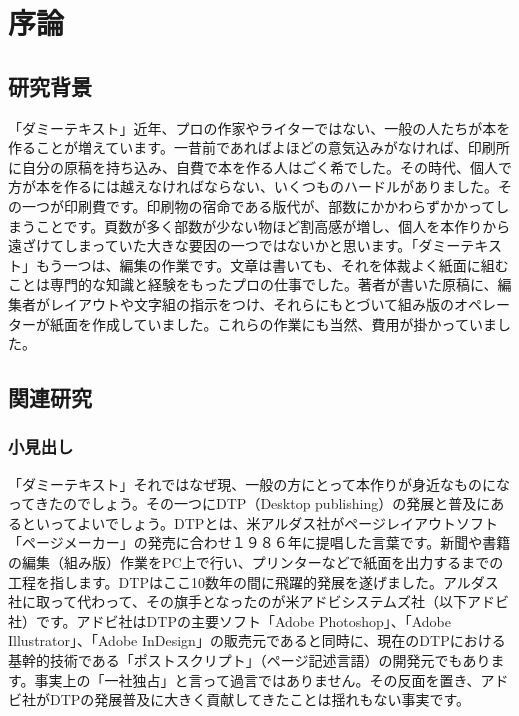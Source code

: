 \documentclass{cuxarticle}
\begin{document}
\begin{titlepage}
  
\end{titlepage}

\tableofcontents

\chapter{序論}

\section{研究背景}
「ダミーテキスト」近年、プロの作家やライターではない、一般の人たちが本を作ることが増えています。一昔前であればよほどの意気込みがなければ、印刷所に自分の原稿を持ち込み、自費で本を作る人はごく希でした。その時代、個人で方が本を作るには越えなければならない、いくつものハードルがありました。その一つが印刷費です。印刷物の宿命である版代が、部数にかかわらずかかってしまうことです。頁数が多く部数が少ない物ほど割高感が増し、個人を本作りから遠ざけてしまっていた大きな要因の一つではないかと思います。「ダミーテキスト」もう一つは、編集の作業です。文章は書いても、それを体裁よく紙面に組むことは専門的な知識と経験をもったプロの仕事でした。著者が書いた原稿に、編集者がレイアウトや文字組の指示をつけ、それらにもとづいて組み版のオペレーターが紙面を作成していました。これらの作業にも当然、費用が掛かっていました。

\section{関連研究}

\subsection{小見出し}
「ダミーテキスト」それではなぜ現、一般の方にとって本作りが身近なものになってきたのでしょう。その一つにDTP（Desktop publishing）の発展と普及にあるといってよいでしょう。DTPとは、米アルダス社がページレイアウトソフト「ページメーカー」の発売に合わせ１９８６年に提唱した言葉です。新聞や書籍の編集（組み版）作業をPC上で行い、プリンターなどで紙面を出力するまでの工程を指します。DTPはここ10数年の間に飛躍的発展を遂げました。アルダス社に取って代わって、その旗手となったのが米アドビシステムズ社（以下アドビ社）です。アドビ社はDTPの主要ソフト「Adobe Photoshop」、「Adobe Illustrator」、「Adobe InDesign」の販売元であると同時に、現在のDTPにおける基幹的技術である「ポストスクリプト」（ページ記述言語）の開発元でもあります。事実上の「一社独占」と言って過言ではありません。その反面を置き、アドビ社がDTPの発展普及に大きく貢献してきたことは揺れもない事実です。
\end{document}
